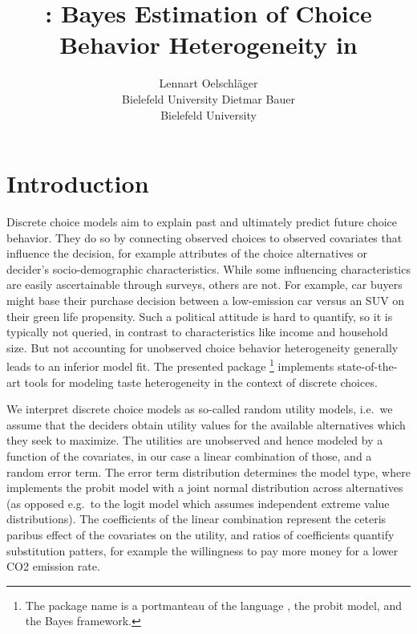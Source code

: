 \documentclass[article,shortnames]{jss}
\author{Lennart Oelschl\"ager \\Bielefeld University \And Dietmar Bauer\\Bielefeld University}
\title{\pkg{RprobitB}: Bayes Estimation of Choice Behavior Heterogeneity in \proglang{R}}
\newcommand{\fct}[1]{\code{#1()}}
\begin{document}



\section{Introduction}
\label{sec:introduction}

Discrete choice models aim to explain past and ultimately predict future choice behavior. They do so by connecting observed choices to observed covariates that influence the decision, for example attributes of the choice alternatives or decider's socio-demographic characteristics. While some influencing characteristics are easily ascertainable through surveys, others are not. For example, car buyers might base their purchase decision between a low-emission car versus an SUV on their green life propensity. Such a political attitude is hard to quantify, so it is typically not queried, in contrast to characteristics like income and household size. But not accounting for unobserved choice behavior heterogeneity generally leads to an inferior model fit. The presented  package \footnote{The package name is a portmanteau of the language , the probit model, and the Bayes framework.} \citep{Oelschlaeger:2021} implements state-of-the-art tools for modeling taste heterogeneity in the context of discrete choices.

We interpret discrete choice models as so-called random utility models, i.e.\ we assume that the deciders obtain utility values for the available alternatives which they seek to maximize. The utilities are unobserved and hence modeled by a function of the covariates, in our case a linear combination of those, and a random error term. The error term distribution determines the model type, where  implements the probit model with a joint normal distribution across alternatives (as opposed e.g.\ to the logit model which assumes independent extreme value distributions). The coefficients of the linear combination represent the ceteris paribus effect of the covariates on the utility, and ratios of coefficients quantify substitution patters, for example the willingness to pay more money for a lower CO2 emission rate.
\end{document}
